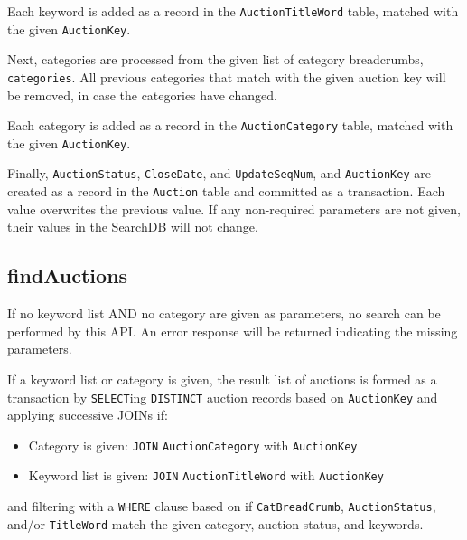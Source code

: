 \documentclass[12pt,a4paper]{article}
\begin{document}
Each keyword is added as a record in the \texttt{AuctionTitleWord} table, matched with the given \texttt{AuctionKey}.

\vspace{\baselineskip}

Next, categories are processed from the given list of category breadcrumbs, \texttt{categories}.
All previous categories that match with the given auction key will be removed, in case the categories have changed.

\vspace{\baselineskip}
Each category is added as a record in the \texttt{AuctionCategory} table, matched with the given \texttt{AuctionKey}.



\vspace{\baselineskip}
Finally, \texttt{AuctionStatus}, \texttt{CloseDate}, and \texttt{UpdateSeqNum}, and \texttt{AuctionKey} are created as a record in the \texttt{Auction} table 
and committed as a transaction.
Each value overwrites the previous value. If any non-required parameters are not given, their values in the SearchDB will not change.



\subsection{findAuctions}

If no keyword list AND no category are given as parameters, no search can be performed by this API.
An error response will be returned indicating the missing parameters.

\vspace{\baselineskip}

If a keyword list or category is given, the result list of auctions is formed as a transaction by \texttt{SELECT}ing \texttt{DISTINCT} auction records based on \texttt{AuctionKey} and applying successive JOINs if:

\begin{itemize}
\item Category is given: \texttt{JOIN} \texttt{AuctionCategory} with \texttt{AuctionKey}
\item Keyword list is given: \texttt{JOIN} \texttt{AuctionTitleWord} with \texttt{AuctionKey}
\end{itemize}
and filtering with a \texttt{WHERE} clause based on if \texttt{CatBreadCrumb}, \texttt{AuctionStatus}, and/or \texttt{TitleWord} match the given category, auction status, and keywords.
\vspace{\baselineskip}
\end{document}
